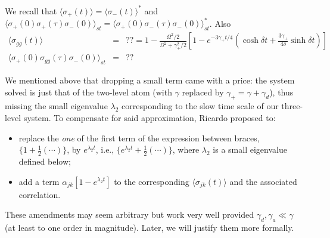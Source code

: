 \documentclass[twocolumn,aps,eqsecnum,showkeys,amsmath]{revtex4-2}
\begin{document}
\begin{widetext}
We recall that 
$\langle \sigma_{+} (t) \rangle = \langle \sigma_{-} (t) \rangle^{\ast}$ 
and 	$\langle \sigma_+ (0) \sigma_{+} (\tau) \sigma_-(0) \rangle_{st} 
= \langle \sigma_+ (0) \sigma_{-} (\tau) \sigma_-(0) \rangle_{st}^{\ast} $. 
Also 
%
\begin{eqnarray} 	
\langle \sigma_{gg} (t) \rangle &=& ?? 
	=1- \frac{\Omega^2/2}{\Omega^2 +\gamma_+^2/2} 
	\left[ 1-e^{-3\gamma_+ t/4} \left( \cosh{\delta t}  
	+ \frac{3 \gamma_+}{4 \delta} \sinh{\delta t} \right)   \right] 	\\ 
\langle \sigma_+ (0) \sigma_{gg} (\tau) \sigma_-(0) \rangle_{st} &=& ??
\end{eqnarray}

We mentioned above that dropping a small term came with a price: the 
system solved is just that of the two-level atom (with $\gamma$ replaced by 
$\gamma_+ =\gamma + \gamma_d$), thus missing the small eigenvalue 
$\lambda_2$ corresponding to the slow time scale of our three-level system. 
To compensate for said approximation, Ricardo proposed to: 
%
\begin{itemize}
\item replace the \textit{one} of the first term 
of the expression between braces, $\{1 +\frac{1}{2} (\cdots) \}$, by 
$e^{\lambda_2 t}$, i.e., $\{ e^{\lambda_2 t} +\frac{1}{2} (\cdots) \}$, 
where $\lambda_2$ is a small eigenvalue defined below;
\item add a term $\alpha_{jk} [ 1- e^{\lambda_2 t} ]$ to the corresponding 
$\langle \sigma_{jk} (t) \rangle$ and the associated correlation. 
\end{itemize}
These amendments may seem arbitrary but work very well 
provided $\gamma_d, \gamma_a \ll \gamma$ (at least to one order in 
magnitude). Later, we will justify them more formally.  


\end{widetext}
\end{document}
